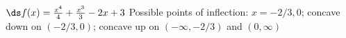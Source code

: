 {$\ds f(x) = \frac{x^4}{4}+\frac{x^3}{3}-2 x+3$
}
{Possible points of inflection: $x=-2/3,0$;
concave down on $(-2/3,0)$;
concave up on $(-\infty,-2/3)$ and $(0,\infty)$
}
